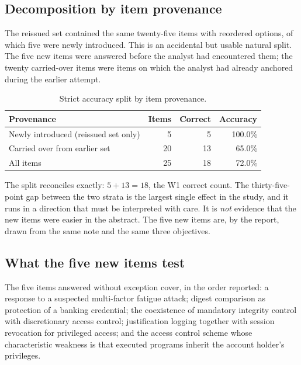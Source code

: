 \documentclass[11pt]{article}
\newcommand{\pct}{\%}
\begin{document}
\subsection{Decomposition by item provenance}
\label{sec:decomposition}

The reissued set contained the same twenty-five items with reordered
options, of which five were newly introduced. This is an accidental but
usable natural split. The five new items were answered before the analyst
had encountered them; the twenty carried-over items were items on which the
analyst had already anchored during the earlier attempt.

\begin{table}[htbp]
\centering
\caption{Strict accuracy split by item provenance.}
\label{tab:provenance}
\begin{tabular}{@{}lrrr@{}}
\toprule
Provenance & Items & Correct & Accuracy \\
\midrule
Newly introduced (reissued set only) & 5 & 5 & 100.0\pct \\
Carried over from earlier set       & 20 & 13 & 65.0\pct \\
\midrule
All items & 25 & 18 & 72.0\pct \\
\bottomrule
\end{tabular}
\end{table}

The split reconciles exactly: $5 + 13 = 18$, the W1 correct count. The
thirty-five-point gap between the two strata is the largest single effect
in the study, and it runs in a direction that must be interpreted with care.
It is \emph{not} evidence that the new items were easier in the abstract. The
five new items are, by the report, drawn from the same note and the same
three objectives.

\subsection{What the five new items test}

The five items answered without exception cover, in the order reported:
a response to a suspected multi-factor fatigue attack; digest comparison as
protection of a banking credential; the coexistence of mandatory integrity
control with discretionary access control; justification logging together
with session revocation for privileged access; and the access control
scheme whose characteristic weakness is that executed programs inherit the
account holder's privileges.
\end{document}
